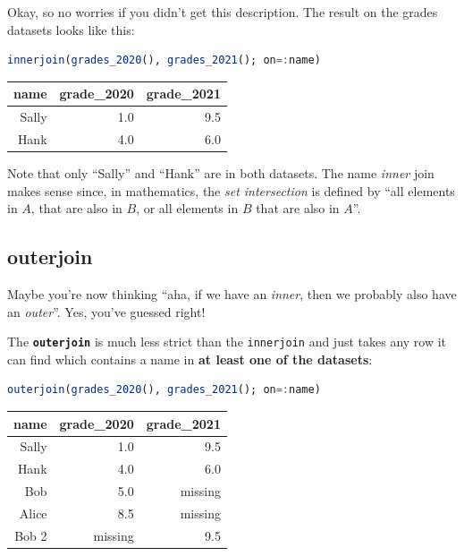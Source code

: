 \documentclass[
  notoc %
]{tufte-book}
\newcommand{\passthrough}[1]{#1}
\begin{document}
Okay, so no worries if you didn't get this description. The result on
the grades datasets looks like this:

\begin{lstlisting}[language=Julia]
innerjoin(grades_2020(), grades_2021(); on=:name)
\end{lstlisting}

\begin{longtable}[]{@{}rrr@{}}
\toprule()
name & grade\_2020 & grade\_2021 \\
\midrule()
\endhead
Sally & 1.0 & 9.5 \\
Hank & 4.0 & 6.0 \\
\bottomrule()
\end{longtable}

Note that only ``Sally'' and ``Hank'' are in both datasets. The name
\emph{inner} join makes sense since, in mathematics, the \emph{set
intersection} is defined by ``all elements in \(A\), that are also in
\(B\), or all elements in \(B\) that are also in \(A\)''.

\hypertarget{sec:outerjoin}{%
\subsection{outerjoin}\label{sec:outerjoin}}

Maybe you're now thinking ``aha, if we have an \emph{inner}, then we
probably also have an \emph{outer}''. Yes, you've guessed right!

The \textbf{\passthrough{\lstinline!outerjoin!}} is much less strict
than the \passthrough{\lstinline!innerjoin!} and just takes any row it
can find which contains a name in \textbf{at least one of the datasets}:

\begin{lstlisting}[language=Julia]
outerjoin(grades_2020(), grades_2021(); on=:name)
\end{lstlisting}

\begin{longtable}[]{@{}rrr@{}}
\toprule()
name & grade\_2020 & grade\_2021 \\
\midrule()
\endhead
Sally & 1.0 & 9.5 \\
Hank & 4.0 & 6.0 \\
Bob & 5.0 & missing \\
Alice & 8.5 & missing \\
Bob 2 & missing & 9.5 \\
\bottomrule()
\end{longtable}
\end{document}
